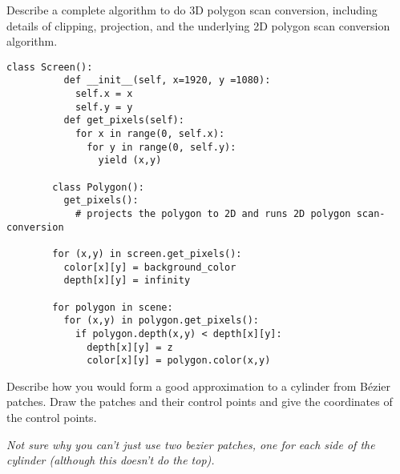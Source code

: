\documentclass{supervision}
\begin{document}
\begin{questions}
  \question

  \question Describe a complete algorithm to do 3D polygon scan conversion,
    including details of clipping, projection, and the underlying 2D polygon
    scan conversion algorithm.
    \begin{solution}

      \begin{lstlisting}[gobble=8]
        class Screen():
          def __init__(self, x=1920, y =1080):
            self.x = x
            self.y = y
          def get_pixels(self):
            for x in range(0, self.x):
              for y in range(0, self.y):
                yield (x,y)

        class Polygon():
          get_pixels():
            # projects the polygon to 2D and runs 2D polygon scan-conversion

        for (x,y) in screen.get_pixels():
          color[x][y] = background_color
          depth[x][y] = infinity

        for polygon in scene:
          for (x,y) in polygon.get_pixels():
            if polygon.depth(x,y) < depth[x][y]:
              depth[x][y] = z
              color[x][y] = polygon.color(x,y)
      \end{lstlisting}

    \end{solution}

  \question Describe how you would form a good approximation to a cylinder
    from Bézier patches. Draw the patches and their control points and give
    the coordinates of the control points.
    \begin{solution}
      \emph{Not sure why you can't just use two bezier patches, one for each side of the cylinder (although this doesn't do the top).}
    \end{solution}


\end{questions}
\end{document}
